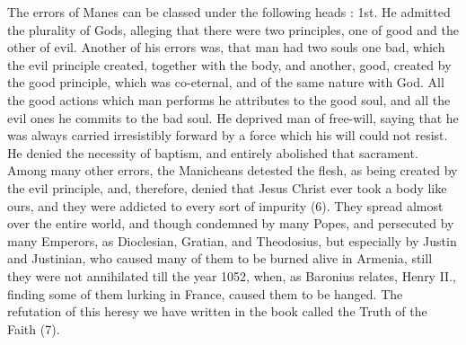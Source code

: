 \documentclass[12pt]{book}
\begin{document}
The errors of Manes can be classed under the following heads : 1st. He admitted the plurality of Gods,
alleging that there were two principles, one of good and the other of evil. Another of his errors was, that
man had two souls one bad, which the evil principle created, together with the body, and another, good,
created by the good principle, which was co-eternal, and of the same nature with God. All the good
actions which man performs he attributes to the good soul, and all the evil ones he commits to the bad
soul. He deprived man of free-will, saying that he was always carried irresistibly forward by a force
which his will could not resist. He denied the necessity of baptism, and entirely abolished that sacrament.
Among many other errors, the Manicheans detested the flesh, as being created by the evil principle, and,
therefore, denied that Jesus Christ ever took a body like ours, and they were addicted to every sort of
impurity (6). They spread almost over the entire world, and though condemned by many Popes, and
persecuted by many Emperors, as Dioclesian, Gratian, and Theodosius, but especially by Justin and
Justinian, who caused many of them to be burned alive in Armenia, still they were not annihilated till the
year 1052, when, as Baronius relates, Henry II., finding some of them lurking in France, caused them to be
hanged. The refutation of this heresy we have written in the book called the Truth of the Faith (7).
\end{document}

